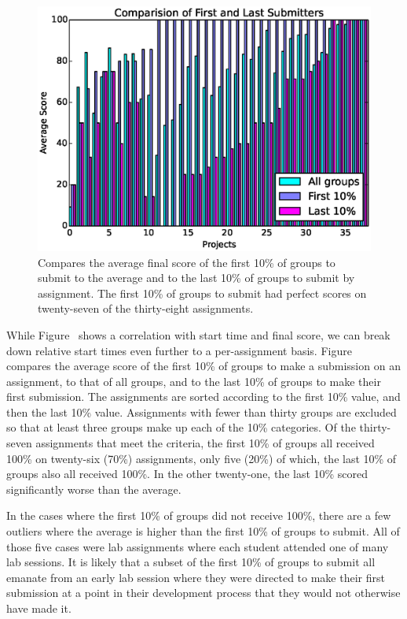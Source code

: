 \begin{figure}[!t]
\centering
\includegraphics[width=5.25in]{graphs/Comparision_of_First_and_Last_Submitters.eps}
\caption{Compares the average final score of the first 10\% of groups to submit
  to the average and to the last 10\% of groups to submit by assignment. The
  first 10\% of groups to submit had perfect scores on twenty-seven of the
  thirty-eight assignments.}
\end{figure}

While Figure~ shows a correlation with start
time and final score, we can break down relative start times even further to a
per-assignment basis. Figure~ compares the average
score of the first 10\% of groups to make a submission on an assignment, to
that of all groups, and to the last 10\% of groups to make their first
submission. The assignments are sorted according to the first 10\% value, and
then the last 10\% value. Assignments with fewer than thirty groups are
excluded so that at least three groups make up each of the 10\% categories. Of
the thirty-seven assignments that meet the criteria, the first 10\% of groups
all received 100\% on twenty-six (70\%) assignments, only five (20\%) of which,
the last 10\% of groups also all received 100\%. In the other twenty-one, the
last 10\% scored significantly worse than the average.

In the cases where the first 10\% of groups did not receive 100\%, there are a
few outliers where the average is higher than the first 10\% of groups to
submit. All of those five cases were lab assignments where each student
attended one of many lab sessions. It is likely that a subset of the first 10\%
of groups to submit all emanate from an early lab session where they were
directed to make their first submission at a point in their development process
that they would not otherwise have made it.

